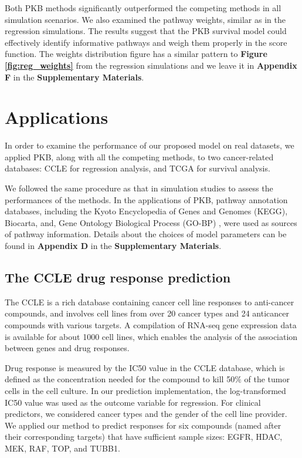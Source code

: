\documentclass[a4paper,12pt]{article}
\begin{document}
Both PKB methods significantly outperformed the competing methods in all  simulation scenarios. We also examined the pathway weights, similar as in the regression simulations. The results suggest that the PKB survival model could effectively identify informative pathways and weigh them properly in the score function. The weights distribution figure has a similar pattern to \textbf{Figure \ref{fig:reg_weights}} from the regression simulations and we leave it in \textbf{Appendix F} in the \textbf{Supplementary Materials}.

\section{Applications}\label{results}
In order to examine the performance of our proposed model on real datasets, we applied PKB, along with all the competing methods, to two cancer-related databases: CCLE\citep{barretina2012cancer} for regression analysis, and TCGA for survival analysis. 

We followed the same procedure as that in simulation studies to assess the performances of the methods. In the applications of PKB, pathway annotation databases, including the Kyoto Encyclopedia of Genes and Genomes (KEGG), \citep{kanehisa2000kegg} Biocarta, \citep{nishimura2001biocarta} and, Gene Ontology Biological Process (GO-BP) \citep{ashburner2000gene, gene2016expansion}, were used as sources of pathway information. Details about the choices of model parameters can be found in \textbf{Appendix D} in the \textbf{Supplementary Materials}.

\subsection{The CCLE drug response prediction}

The CCLE is a rich database containing cancer cell line responses to anti-cancer compounds, and involves cell lines from over 20 cancer types and 24 anticancer compounds with various targets. A compilation of RNA-seq gene expression data is available for about 1000 cell lines, which enables the analysis of the association between genes and drug responses. 

Drug response is measured by the IC50 value in the CCLE database, which is defined as the concentration needed for the compound to kill 50$\%$ of the tumor cells in the cell culture. \citep{barretina2012cancer} In our prediction implementation, the log-transformed IC50 value was used as the outcome variable for regression. For clinical predictors, we considered cancer types and the gender of the cell line provider. We applied our method to predict responses for six compounds (named after their corresponding targets) that have sufficient sample sizes: EGFR, HDAC, MEK, RAF, TOP, and TUBB1. 
\end{document}
